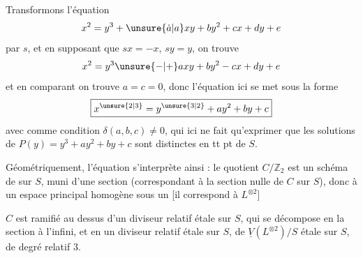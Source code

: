 
Transformons l'équation
\[
x^2=y^3+\unsure{\dot a|a}xy+by^2+cx+dy+e
\]
par $s$, et en supposant que $sx=-x$, $sy=y$, on trouve
\[
x^2=y^3\unsure{-|+}axy+by^2-cx+dy+e
\]
et en comparant on trouve $a=c=0$, donc l'équation ici se met sous la forme
\[
\boxed{x^{\unsure{2|3}}=y^{\unsure{3|2}}+ay^2+by+c}
\]
avec comme condition $\delta(a,b,c)\neq0$, qui ici ne fait qu'exprimer que les solutions de $P(y)=y^3+ay^2+by+c$ sont distinctes en tt pt de $S$.

Géométriquement,  l'équation s'interprète ainsi : le quotient $C/\mathbb Z_2$ est un schéma de   sur $S$, muni d'une section  (correspondant à la section nulle de $C$ sur $S$), donc    à un espace principal homogène sous un     [il correspond à $L^{\otimes2}$]

$C$ est ramifié  au dessus d'un diviseur relatif  étale sur $S$, qui se décompose en la section à l'infini, et en un diviseur relatif  étale sur $S$,  de  $\underline V(L^{\otimes2})/S$ étale sur $S$, de degré relatif $3$.
